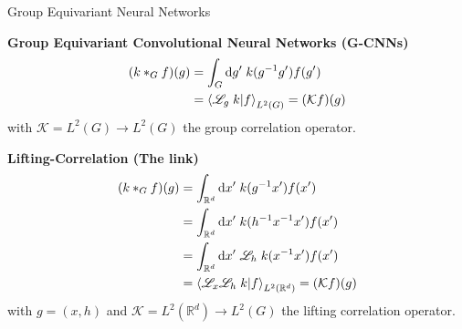 \documentclass[9pt,dvipsnames]{beamer}
\begin{document}
\begin{frame}{Group Equivariant Neural Networks}

	\begin{block}{\bf Group Equivariant Convolutional Neural Networks (G-CNNs)}
		\begin{equation}
			\begin{split}
				(k *_{G} f)(g) & = \int_G \dd g' \; k(g^{-1} g') f(g')                          \\
				               & = \braket{\mathscr{L}_g \; k}{f}_{L^2(G)} = (\mathcal{K} f)(g)
			\end{split}
		\end{equation}
		with $\mathcal{K} = L^2(G) \to L^2(G)$ the group correlation operator.
	\end{block}

	\begin{block}{\bf Lifting-Correlation {\color{red} (The link)}}
		\begin{equation}
			\begin{split}
				(k *_{G} f)(g) & = \int_{\mathbb{R}^d} \dd x' \; k(g^{-1} x') f(x')                                      \\
				               & = \int_{\mathbb{R}^d} \dd x' \; k(h^{-1}x^{-1} x') f(x')                                \\
				               & = \int_{\mathbb{R}^d} \dd x' \; \mathscr{L}_h \; k(x^{-1} x') f(x')                     \\
				               & = \braket{\mathscr{L}_x \mathscr{L}_h \; k}{f}_{L^2(\mathbb{R}^d)} = (\mathcal{K} f)(g)
			\end{split}
		\end{equation}
		with $g = (x, h)$ and $\mathcal{K} = L^2(\mathbb{R}^d) \to L^2(G)$ the lifting correlation operator.
	\end{block}

\end{frame}
\end{document}
